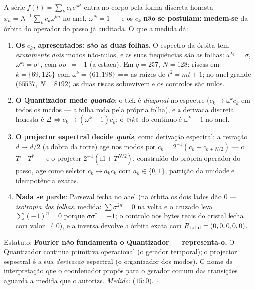 \documentclass[livro.tex]{subfiles}
\begin{document}
\begin{teorema}\label{thm:metronomo-fourier}
A série $f(t)=\sum_{k}c_{k}e^{ikt}$ entra no corpo pela forma discreta
honesta --- $x_{n}=N^{-1}\sum_{k}c_{k}\omega^{kn}$ no anel, $\omega^{N}=1$
--- e os $c_{k}$ \textbf{não se postulam: medem-se} da órbita do operador do passo
já auditada. O que a medida dá:
\begin{enumerate}
\item \textbf{Os $c_{k}$, apresentados: são as duas folhas.} O espectro
da órbita tem \emph{exatamente dois} modos não-nulos, e as suas
frequências são as folhas: $\omega^{k_{1}}=\sigma$,
$\omega^{k_{2}}=\sigma^{\dagger}$, com $\sigma\sigma^{\dagger}=-1$ (a
estaca). Em $q=257$, $N=128$: riscas em $k=\{69,123\}$ com
$\omega^{k}=\{61,198\}$ == as raízes de $t^{2}=mt+1$; no anel grande
($65537$, $N=8192$) as duas riscas sobrevivem e os controlos são nulos.
\item \textbf{O Quantizador mede \emph{quando}}: o tick é
\emph{diagonal} no espectro ($c_{k}\mapsto\omega^{k}c_{k}$ em todos os
modos --- a folha roda pela própria folha), e a derivada discreta
honesta é $\Delta\!\iff\!c_{k}\mapsto(\omega^{k}{-}1)c_{k}$: o «$ik$»
do contínuo é $\omega^{k}-1$ no anel.
\item \textbf{O projector espectral decide \emph{quais}}, como derivação
espectral: a retração $d\to d/2$ (a dobra da torre) age nos modos por
$\hat{c}_{k}=2^{-1}(c_{k}+c_{k+N/2})$ --- o $T{+}T^{*}$ --- e o
projetor $2^{-1}(\mathrm{id}+T^{N/2})$, construído do própria operador do passo,
age como seletor $c_{k}\mapsto a_{k}c_{k}$ com $a_{k}\in\{0,1\}$,
partição da unidade e idempotência exatas.
\item \textbf{Nada se perde}: Parseval fecha no anel (na órbita os
dois lados dão $0$ --- \emph{isotropia das folhas}, medida:
$\sum\sigma^{2n}=0$ na volta e o cruzado leva $\sum(-1)^{n}=0$ porque
$\sigma\sigma^{\dagger}=-1$; o controlo nos bytes reais do cristal
fecha com valor $\neq0$), e a inversa devolve a órbita exata com
$R_{\rm total}=(0,0,0,0,0)$.
\end{enumerate}
Estatuto: \textbf{Fourier não fundamenta o Quantizador --- representa-o.}
O Quantizador continua primitiva operacional (o gerador temporal); o
projector espectral é a sua \emph{derivação} espectral (o organizador dos modos).
O nome de interpretação que o coordenador propôs para o gerador comum
das transições aguarda a medida que o autorize.
\emph{Medido:}  ($15{:}0$). $\square$
\end{teorema}
\end{document}
